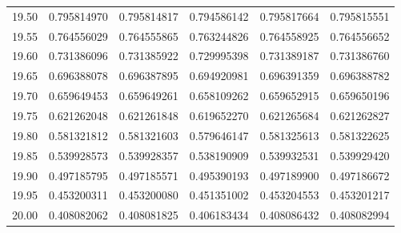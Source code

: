 \documentclass[11pt,a4paper]{article}
\begin{document}
\begin{longtable}{rrrrrr}
19.50 & 0.795814970 & 0.795814817 & 0.794586142 & 0.795817664 & 0.795815551 \\
19.55 & 0.764556029 & 0.764555865 & 0.763244826 & 0.764558925 & 0.764556652 \\
19.60 & 0.731386096 & 0.731385922 & 0.729995398 & 0.731389187 & 0.731386760 \\
19.65 & 0.696388078 & 0.696387895 & 0.694920981 & 0.696391359 & 0.696388782 \\
19.70 & 0.659649453 & 0.659649261 & 0.658109262 & 0.659652915 & 0.659650196 \\
19.75 & 0.621262048 & 0.621261848 & 0.619652270 & 0.621265684 & 0.621262827 \\
19.80 & 0.581321812 & 0.581321603 & 0.579646147 & 0.581325613 & 0.581322625 \\
19.85 & 0.539928573 & 0.539928357 & 0.538190909 & 0.539932531 & 0.539929420 \\
19.90 & 0.497185795 & 0.497185571 & 0.495390193 & 0.497189900 & 0.497186672 \\
19.95 & 0.453200311 & 0.453200080 & 0.451351002 & 0.453204553 & 0.453201217 \\
20.00 & 0.408082062 & 0.408081825 & 0.406183434 & 0.408086432 & 0.408082994 \\
\end{longtable}
\endgroup
\end{document}

